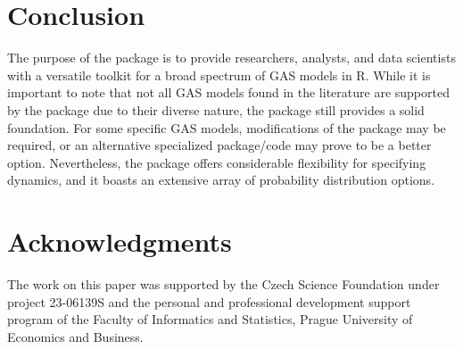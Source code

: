 \section{Conclusion}\label{conclusion}

The purpose of the  package is to provide researchers, analysts, and data scientists with a versatile toolkit for a broad spectrum of GAS models in R. While it is important to note that not all GAS models found in the literature are supported by the package due to their diverse nature, the package still provides a solid foundation. For some specific GAS models, modifications of the package may be required, or an alternative specialized package/code may prove to be a better option. Nevertheless, the  package offers considerable flexibility for specifying dynamics, and it boasts an extensive array of probability distribution options.

\section{Acknowledgments}\label{acknowledgments}

The work on this paper was supported by the Czech Science Foundation under project 23-06139S and the personal and professional development support program of the Faculty of Informatics and Statistics, Prague University of Economics and Business.



\address{%
Vladimír Holý\\
Prague University of Economics and Business\\%
Department of Econometrics\\ Winston Churchill Square 1938/4, 130 67 Prague 3, Czechia\\
%
%
\textit{ORCiD: \href{https://orcid.org/0000-0003-0416-0434}{0000-0003-0416-0434}}\\%
\href{mailto:vladimir.holy@vse.cz}{\nolinkurl{vladimir.holy@vse.cz}}%
}
